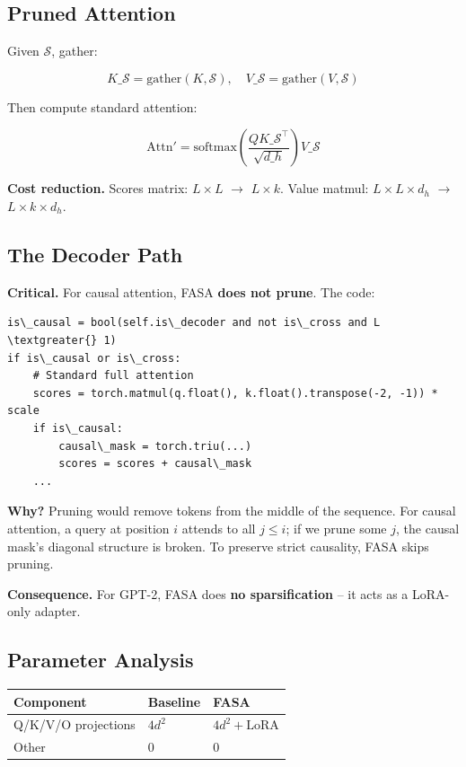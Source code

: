 \subsection{Pruned Attention}

Given $\mathcal{S}$, gather:

\[
K\_{\mathcal{S}} = \text{gather}(K, \mathcal{S}), \quad
V\_{\mathcal{S}} = \text{gather}(V, \mathcal{S})
\tag{4.6}
\]

Then compute standard attention:

\[
\text{Attn}' = \text{softmax}\!\left(\frac{Q K\_{\mathcal{S}}^\top}{\sqrt{d\_h}}\right)V\_{\mathcal{S}}
\tag{4.7}
\]

\textbf{Cost reduction.} Scores matrix: $L \times L$ $\to$ $L \times k$. Value matmul: 
$L \times L \times d_h$ $\to$ $L \times k \times d_h$.

\subsection{The Decoder Path}

\textbf{Critical.} For causal attention, FASA \textbf{does not prune}. The code:

\begin{lstlisting}
is\_causal = bool(self.is\_decoder and not is\_cross and L \textgreater{} 1)
if is\_causal or is\_cross:
    # Standard full attention
    scores = torch.matmul(q.float(), k.float().transpose(-2, -1)) * scale
    if is\_causal:
        causal\_mask = torch.triu(...)
        scores = scores + causal\_mask
    ...
\end{lstlisting}

\textbf{Why?} Pruning would remove tokens from the middle of the sequence. For 
causal attention, a query at position $i$ attends to all $j \leq i$; if we 
prune some $j$, the causal mask's diagonal structure is broken. To preserve 
strict causality, FASA skips pruning.

\textbf{Consequence.} For GPT-2, FASA does \textbf{no sparsification} -- it acts as a 
LoRA-only adapter.

\subsection{Parameter Analysis}

\begin{table}[H]
\centering
\small
\begin{tabular}{lll}
\toprule
\textbf{Component} & \textbf{Baseline} & \textbf{FASA} \\
\midrule
Q/K/V/O projections & $4d^2$ & $4d^2 + \text{LoRA}$ \\
Other & 0 & 0 \\
\bottomrule
\end{tabular}
\end{table}

